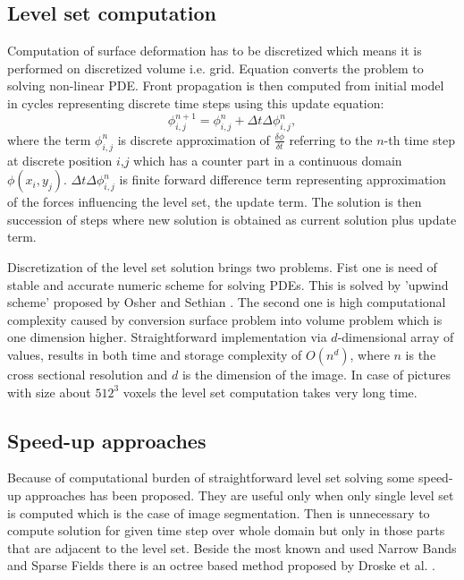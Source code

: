 \subsection{Level set computation}

Computation of surface deformation has to be discretized which means it is performed on discretized volume i.e. grid.
Equation converts the problem to solving non-linear PDE.
Front propagation is then computed from initial model in cycles representing discrete time steps using this update equation:
\begin{equation}
\label{deformEqApprox}
\phi_{i,j}^{n+1} = \phi_{i,j}^{n} + \Delta t \Delta \phi_{i,j}^{n},
\end{equation}
where the term $\phi_{i,j}^{n}$ is discrete approximation of $\frac{\delta\phi}{\delta t}$ referring to the $n$-th time step at discrete position $i$,$j$ which has a counter part in a continuous domain $\phi(x_i, y_j)$.
$\Delta t \Delta \phi_{i,j}^{n}$ is finite forward difference term representing approximation of the forces influencing the level set, the update term.
The solution is then succession of steps where new solution is obtained as current solution plus update term.

Discretization of the level set solution brings two problems.
Fist one is need of stable and accurate numeric scheme for solving PDEs.
This is solved by 'upwind scheme' proposed by Osher and Sethian \cite{sethianLS}.
The second one is high computational complexity caused by conversion surface problem into volume problem which is one dimension higher.
Straightforward implementation via $d$-dimensional array of values, results in both time and storage complexity of $O(n^d)$, where $n$ is the cross sectional resolution and $d$ is the dimension of the image.
In case of pictures with size about $512^3$ voxels the level set computation takes very long time.

\subsection{Speed-up approaches}

Because of computational burden of straightforward level set solving some speed-up approaches has been proposed.
They are useful only when only single level set is computed which is the case of image segmentation.
Then is unnecessary to compute solution for given time step over whole domain but only in those parts that are adjacent to the level set.
Beside the most known and used Narrow Bands and Sparse Fields there is an octree based method proposed by Droske et al. \cite{octree}.

